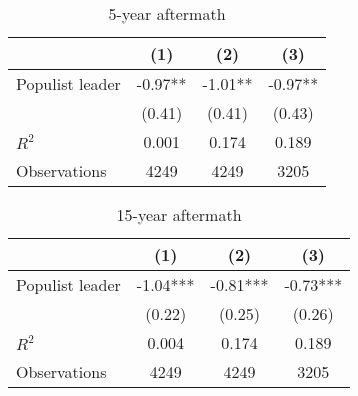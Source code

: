 \begin{table}[htbp]\centering
\def\sym#1{\ifmmode^{#1}\else\(^{#1}\)\fi}
\caption{5-year aftermath}
\begin{tabular}{l*{3}{c}}
\hline\hline
                    &\multicolumn{1}{c}{(1)}   &\multicolumn{1}{c}{(2)}   &\multicolumn{1}{c}{(3)}   \\
\hline
Populist leader     &       -0.97** &       -1.01** &       -0.97** \\
                    &      (0.41)   &      (0.41)   &      (0.43)   \\
\hline
\(R^{2}\)           &       0.001   &       0.174   &       0.189   \\
Observations        &        4249   &        4249   &        3205   \\
\hline\hline
\end{tabular}
\end{table}
\begin{table}[htbp]\centering
\def\sym#1{\ifmmode^{#1}\else\(^{#1}\)\fi}
\caption{15-year aftermath}
\begin{tabular}{l*{3}{c}}
\hline\hline
                    &\multicolumn{1}{c}{(1)}   &\multicolumn{1}{c}{(2)}   &\multicolumn{1}{c}{(3)}   \\
\hline
Populist leader     &       -1.04***&       -0.81***&       -0.73***\\
                    &      (0.22)   &      (0.25)   &      (0.26)   \\
\hline
\(R^{2}\)           &       0.004   &       0.174   &       0.189   \\
Observations        &        4249   &        4249   &        3205   \\
\hline\hline
\end{tabular}
\end{table}
